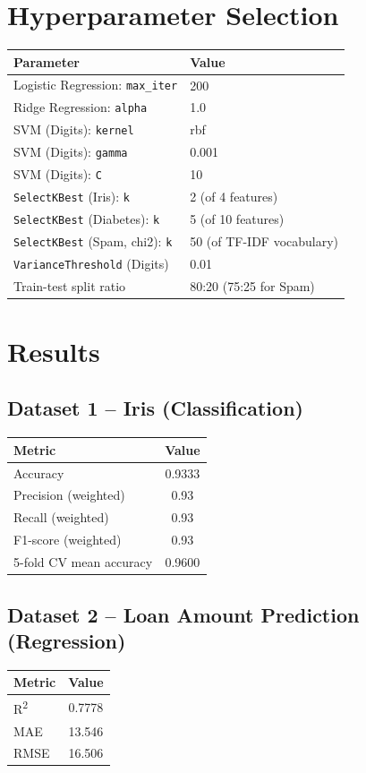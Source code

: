 \documentclass[12pt,a4paper]{article}
\begin{document}
\section{Hyperparameter Selection}

\begin{tabular}{ll}
\toprule
Parameter & Value\\
\midrule
Logistic Regression: \texttt{max\_iter} & 200 \\
Ridge Regression: \texttt{alpha} & 1.0 \\
SVM (Digits): \texttt{kernel} & rbf \\
SVM (Digits): \texttt{gamma} & 0.001 \\
SVM (Digits): \texttt{C} & 10 \\
\texttt{SelectKBest} (Iris): \texttt{k} & 2 (of 4 features) \\
\texttt{SelectKBest} (Diabetes): \texttt{k} & 5 (of 10 features) \\
\texttt{SelectKBest} (Spam, chi2): \texttt{k} & 50 (of TF-IDF vocabulary) \\
\texttt{VarianceThreshold} (Digits) & 0.01 \\
Train-test split ratio & 80:20 (75:25 for Spam) \\
\bottomrule
\end{tabular}

\section{Results}

\subsection*{Dataset 1 -- Iris (Classification)}
\begin{tabular}{lc}
\toprule
Metric & Value\\
\midrule
Accuracy & 0.9333 \\
Precision (weighted) & 0.93 \\
Recall (weighted) & 0.93 \\
F1-score (weighted) & 0.93 \\
5-fold CV mean accuracy & 0.9600 \\
\bottomrule
\end{tabular}

\subsection*{Dataset 2 -- Loan Amount Prediction (Regression)}
\begin{tabular}{lc}
\toprule
Metric & Value\\
\midrule
R\textsuperscript{2} & 0.7778 \\
MAE & 13.546 \\
RMSE & 16.506 \\
\bottomrule
\end{tabular}
\end{document}
